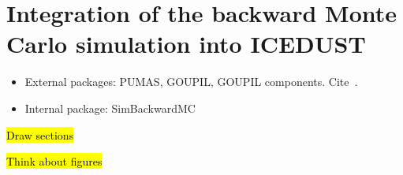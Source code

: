 \chapter{Integration of the backward Monte Carlo simulation into
ICEDUST}\label{app:bmc_integration}

\begin{itemize}
    \item External packages: PUMAS, GOUPIL, GOUPIL components. Cite~\cite{NIESS2022108438}.
    \item Internal package: SimBackwardMC
\end{itemize}

\hl{Draw sections}

\hl{Think about figures}